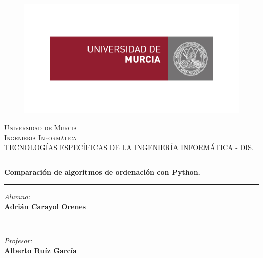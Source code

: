 \begin{titlepage}
		\centering %
		
		\begin{figure}[t]
			\begin{center}
				\includegraphics[scale=0.5]{logo.jpg}
			\end{center}
		\end{figure}
		
		\textsc{\LARGE Universidad de Murcia}\\[1.5cm] 
		\textsc{\Large Ingeniería Informática}\\[0.5cm] 
		\textsc{\large \uppercase{Tecnologías Específicas de la ingeniería informática - DIS.}}\\[0.5cm]
		
		\rule{\linewidth}{2mm}
		{ \Huge \textbf {Comparación de algoritmos de ordenación con Python.}}\\ 
		\rule{\linewidth}{2mm}
		
		\vspace{2mm} %
		
		\begin{minipage}{0.45\textwidth}
			\begin{flushleft}
				\textit{Alumno:}\\
				\textbf{Adrián Carayol Orenes}
			\end{flushleft}
		\end{minipage}
		~ %
		\begin{minipage}{0.45\textwidth}
			\begin{flushright}
				\textit{Profesor:} \\
				\textbf{Alberto Ruíz García}
			\end{flushright}
		\end{minipage}\\[2cm]
\end{titlepage}